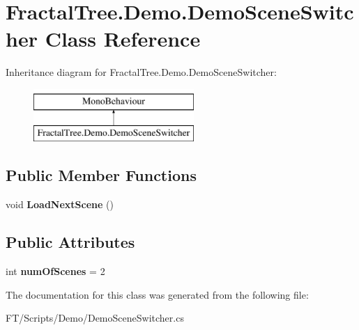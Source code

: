 \hypertarget{class_fractal_tree_1_1_demo_1_1_demo_scene_switcher}{}\section{Fractal\+Tree.\+Demo.\+Demo\+Scene\+Switcher Class Reference}
\label{class_fractal_tree_1_1_demo_1_1_demo_scene_switcher}
Inheritance diagram for Fractal\+Tree.\+Demo.\+Demo\+Scene\+Switcher\+:\begin{figure}[H]
\begin{center}
\leavevmode
\includegraphics[height=2.000000cm]{class_fractal_tree_1_1_demo_1_1_demo_scene_switcher}
\end{center}
\end{figure}
\subsection*{Public Member Functions}
\begin{DoxyCompactItemize}
\item 
\mbox{\label{class_fractal_tree_1_1_demo_1_1_demo_scene_switcher_a2c4499cd9b20b5be784aea61d3ff4cd4}} 
void {\bfseries Load\+Next\+Scene} ()
\end{DoxyCompactItemize}
\subsection*{Public Attributes}
\begin{DoxyCompactItemize}
\item 
\mbox{\label{class_fractal_tree_1_1_demo_1_1_demo_scene_switcher_a6393450e105e7e68ff2dc67942140593}} 
int {\bfseries num\+Of\+Scenes} = 2
\end{DoxyCompactItemize}


The documentation for this class was generated from the following file\+:\begin{DoxyCompactItemize}
\item 
F\+T/\+Scripts/\+Demo/Demo\+Scene\+Switcher.\+cs\end{DoxyCompactItemize}

